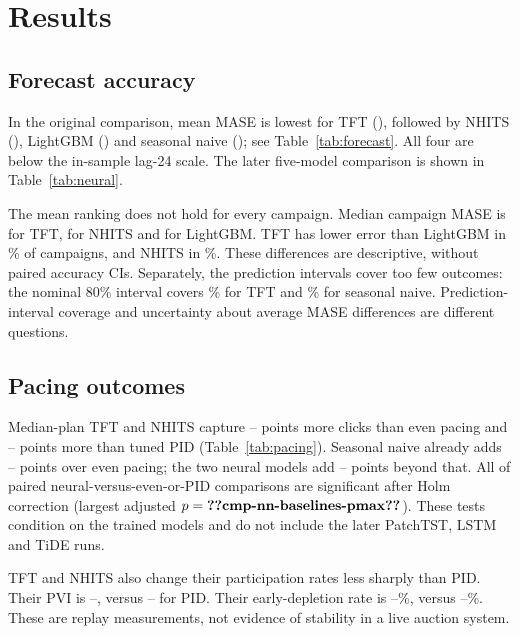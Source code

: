 \documentclass[sigconf,nonacm]{acmart}
\begin{document}
\section{Results}

\subsection{Forecast accuracy}
In the original comparison, mean MASE is lowest for TFT
(), followed by NHITS (), LightGBM
() and seasonal naive (); see
Table~\ref{tab:forecast}. All four are below the in-sample lag-24 scale.
The later five-model comparison is shown in Table~\ref{tab:neural}.

The mean ranking does not hold for every campaign. Median campaign MASE is
 for TFT,  for NHITS and
 for LightGBM. TFT has lower error than LightGBM in
\% of campaigns, and NHITS in
\%. These differences are descriptive, without paired
accuracy CIs. Separately, the prediction intervals cover too few outcomes:
the nominal 80\% interval covers \% for TFT and
\% for seasonal naive. Prediction-interval coverage and
uncertainty about average MASE differences are different questions.

\subsection{Pacing outcomes}\label{sec:pacing}
Median-plan TFT and NHITS capture --
points more clicks than even pacing and --
points more than tuned PID (Table~\ref{tab:pacing}). Seasonal naive already
adds -- points over even
pacing; the two neural models add --
points beyond that. All  of
 paired neural-versus-even-or-PID comparisons are
significant after Holm correction (largest adjusted $p=\res{cmp-nn-baselines-pmax}$).
These tests condition on the trained models and do not include the later
PatchTST, LSTM and TiDE runs.

TFT and NHITS also change their participation rates less sharply than PID.
Their PVI is --, versus
-- for PID. Their early-depletion rate is
--\%, versus
--\%. These are replay measurements,
not evidence of stability in a live auction system.
\end{document}
